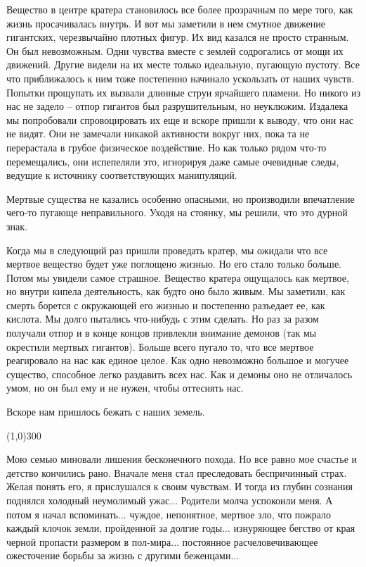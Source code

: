 \documentclass[12pt,a4paper]{article}
\newcommand{\sep}{
	\begin{center}
		\line(1,0){300}
	\end{center}
}
\begin{document}
Вещество в центре кратера становилось все более прозрачным по мере того, как жизнь просачивалась внутрь. И вот мы заметили в нем смутное движение гигантских, черезвычайно плотных фигур. Их вид казался не просто странным. Он был невозможным. Одни чувства вместе с землей содрогались от мощи их движений. Другие видели на их месте только идеальную, пугающую пустоту. Все что приближалось к ним тоже постепенно начинало ускользать от наших чувств. Попытки прощупать их вызвали длинные струи ярчайшего пламени. Но никого из нас не задело -- отпор гигантов был разрушительным, но неуклюжим. Издалека мы попробовали спровоцировать их еще и вскоре пришли к выводу, что они нас не видят. Они не замечали никакой активности вокруг них, пока та не перерастала в грубое физическое воздействие. Но как только рядом что-то перемещались, они испепеляли это, игнорируя даже самые очевидные следы, ведущие к источнику соответствующих манипуляций.

Мертвые существа не казались особенно опасными, но производили впечатление чего-то пугающе неправильного. Уходя на стоянку, мы решили, что это дурной знак.

Когда мы в следующий раз пришли проведать кратер, мы ожидали что все мертвое вещество будет уже поглощено жизнью. Но его стало только больше. Потом мы увидели самое страшное. Вещество кратера ощущалось как мертвое, но внутри кипела деятельность, как будто оно было живым. Мы заметили, как смерть борется с окружающей его жизнью и постепенно разъедает ее, как кислота. Мы долго пытались что-нибудь с этим сделать. Но раз за разом получали отпор и в конце концов привлекли внимание демонов (так мы окрестили мертвых гигантов). Больше всего пугало то, что все мертвое реагировало на нас как единое целое. Как одно невозможно большое и могучее существо, способное легко раздавить всех нас. Как и демоны оно не отличалось умом, но он был ему и не нужен, чтобы оттеснять нас.

Вскоре нам пришлось бежать с наших земель.

\sep

Мою семью миновали лишения бесконечного похода. Но все равно мое счастье и детство кончились рано. Вначале меня стал преследовать беспричинный страх. Желая понять его, я прислушался к своим чувствам. И тогда из глубин сознания поднялся холодный неумолимый ужас... Родители молча успокоили меня. А потом я начал вспоминать... чуждое, непонятное, мертвое зло, что пожрало каждый клочок земли, пройденной за долгие годы... изнуряющее бегство от края черной пропасти размером в пол-мира... постоянное расчеловечивающее ожесточение борьбы за жизнь с другими беженцами...
\end{document}
